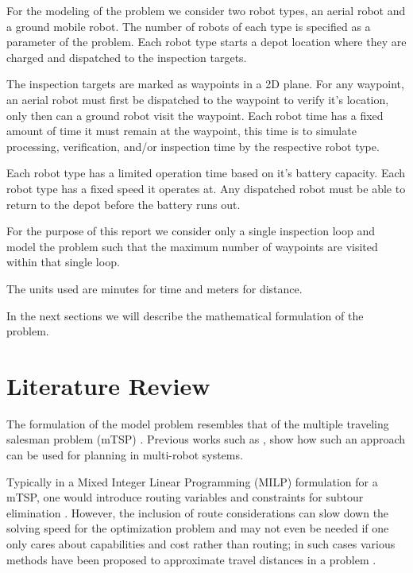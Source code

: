 \documentclass{article}
\begin{document}
		For the modeling of the problem we consider two robot types, an aerial robot and a ground mobile robot. 
		The number of robots of each type is specified as a parameter of the problem.
		Each robot type starts a depot location where they are charged and dispatched to the inspection targets.

		The inspection targets are marked as waypoints in a 2D plane.
		For any waypoint, an aerial robot must first be dispatched to the waypoint to verify it's location, only then can a ground robot visit the waypoint.
		Each robot time has a fixed amount of time it must remain at the waypoint, this time is to simulate processing, verification, and/or inspection time by the respective robot type.

		Each robot type has a limited operation time based on it's battery capacity.
		Each robot type has a fixed speed it operates at.
		Any dispatched robot must be able to return to the depot before the battery runs out.

		For the purpose of this report we consider only a single inspection loop and model the problem such that the maximum number of waypoints are visited within that single loop.

		The units used are minutes for time and meters for distance.

		In the next sections we will describe the mathematical formulation of the problem.

	

	\section{Literature Review}

		The formulation of the model problem resembles that of the multiple traveling salesman problem (mTSP) .
		Previous works such as \cite{oberlin2009transformation} \cite{albert2017uav}, show how such an approach can be used for planning in multi-robot systems.

		Typically in a Mixed Integer Linear Programming (MILP) formulation for a mTSP, one would introduce routing variables and constraints for subtour elimination \cite{bektas2006multiple}. 
		However, the inclusion of route considerations can slow down the solving speed for the optimization problem and may not even be needed if one only cares about capabilities and cost rather than routing; in such cases various methods have been proposed to approximate travel distances in a problem \cite{NICOLA201967}.
\end{document}
